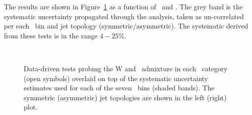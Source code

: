 The results are shown in Figure~\ref{fig:closureBTag} as a function of \scalht~and \njet. 
The grey band is the systematic uncertainty propagated through the analysis, 
taken as un-correlated per each \scalht~bin and jet topology (symmetric/asymmetric). The systematic derived from these tests is
in the range $4-25\%$.

\begin{figure}[h!]
  \begin{center}
    ~~
    \caption{Data-driven tests probing the W and \ttbar~admixture 
      in each \njet~category (open symbols) overlaid on top of the systematic
      uncertainty estimates used for each of the seven \scalht~bins
      (shaded bands). 
      The symmetric (asymmetric) jet topologies are shown in the left (right) plot.      
    }
    \label{fig:closureBTag}
  \end{center} 
\end{figure}

